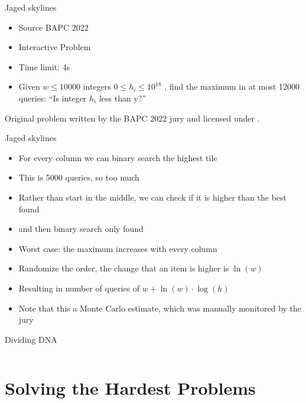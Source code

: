 \documentclass[11pt,pdf, aspectratio=169]{beamer}
\begin{document}
  \begin{frame}{Jaged skylines}
    \begin{itemize}
      \item Source BAPC 2022
      \item Interactive Problem
      \item Time limit: 4s
      \item  Given $w \leq 10000$ integers $0 \leq h_i \leq 10^{18}$ , find the maximum in at most 12000 queries: ``Is integer $h_i$ less than y?''
    \end{itemize}
    Original problem written by the BAPC 2022 jury and licensed under \doclicenseLongNameRef.

    \doclicenseImage
  \end{frame}
  \begin{frame}{Jaged skylines}
    \begin{itemize}
      \item<+-> For every column we can binary search the highest tile
      \item<+-> This is 5000 queries, so too much
      \item<+-> Rather than start in the middle, we can check if it is higher than the best found
      \item<+-> and then binary search only found
      \item<+-> Worst case: the maximum increases with every column
      \item<+-> Randomize the order, the change that an item is higher is $\ln(w)$
      \item<+-> Resulting in number of queries of $w+\ln(w)\cdot \log(h)$
      \item<+-> Note that this a Monte Carlo estimate, which was manually monitored by the jury
    \end{itemize}
  \end{frame}
  \begin{frame}[containsverbatim]{Dividing DNA}
    \inputminted{python}{code/session-4/bapc-j.py}
  \end{frame}


  \section{Solving the Hardest Problems}
\end{document}
